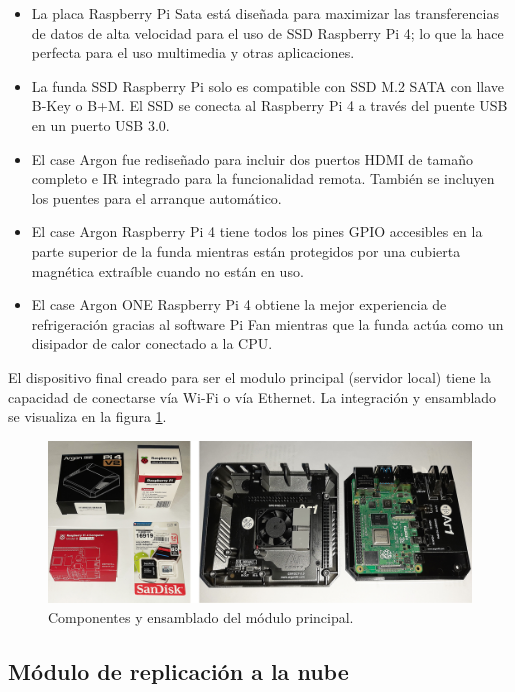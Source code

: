 \begin{itemize}
\item La placa Raspberry Pi Sata está diseñada para maximizar las transferencias de datos de alta velocidad para el uso de SSD Raspberry Pi 4; lo que la hace perfecta para el uso multimedia y otras aplicaciones. 
\item La funda SSD Raspberry Pi solo es compatible con SSD M.2 SATA con llave B-Key o B+M. El SSD se conecta al Raspberry Pi 4 a través del puente USB en un puerto USB 3.0. 
\item El case Argon fue rediseñado para incluir dos puertos HDMI de tamaño completo e IR integrado para la funcionalidad remota. También se incluyen los puentes para el arranque automático. 
\item El case Argon Raspberry Pi 4 tiene todos los pines GPIO accesibles en la parte superior de la funda mientras están protegidos por una cubierta magnética extraíble cuando no están en uso. 
\item El case Argon ONE Raspberry Pi 4 obtiene la mejor experiencia de refrigeración gracias al software Pi Fan mientras que la funda actúa como un disipador de calor conectado a la CPU.
\end{itemize}

El dispositivo final creado para ser el modulo principal (servidor local) tiene la capacidad de conectarse vía Wi-Fi o vía Ethernet. La integración y ensamblado se visualiza en la figura \ref{fig:armado}.

\begin{figure}[htpb]
\centering 
\includegraphics[width=1.0\textwidth]{./Figures/m1-2.jpg}
\caption{Componentes y ensamblado del módulo principal.}
\label{fig:armado}
\end{figure}

\subsection{Módulo de replicación a la nube}

